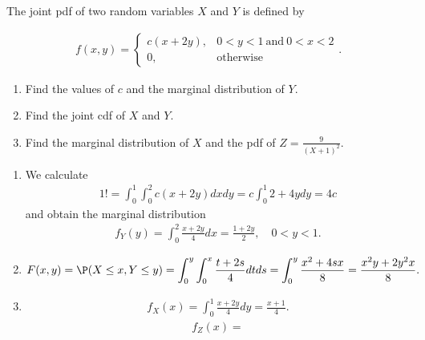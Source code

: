 
\begin{exercise}

The joint pdf of two random variables $X$ and $Y$ is defined by

\begin{align*}
    f(x, y)
    =
    \begin{cases}
        c (x + 2 y), & 0 < y < 1 ~\text{and}~ 0 < x < 2 \\
        0,           & \text{otherwise}
    \end{cases}.
\end{align*}

\begin{enumerate}[label = (\alph*)]
    \item Find the values of $c$ and the marginal distribution of $Y$.
    \item Find the joint cdf of $X$ and $Y$.
    \item Find the marginal distribution of $X$ and the pdf of $Z = \frac{9}{(X + 1)^2}$.
\end{enumerate}

\end{exercise}


\begin{solution}

\phantom{}

\begin{enumerate}[label = (\alph*)]
  \item We calculate
  \begin{align*}
    1 != \int_0^1\int_0^2 c(x + 2y) dx dy = c\int_0^1 2 + 4y dy = 4c
  \end{align*}
  and obtain the marginal distribution
  \begin{align*}
    f_Y(y) = \int_0^2 \frac{x + 2y}{4} dx = \frac{1 + 2y}{2}, \quad 0 < y < 1.
  \end{align*}
  \item
  \begin{align*}
    F(x,y) = \P(X \leq x, Y \leq y) = \int_0^y\int_0^x \frac{t+2s}{4} dt ds
    = \int_0^y \frac{x^2 + 4sx}{8} = \frac{x^2y + 2y^2x}{8}.
  \end{align*}
  \item
  \begin{align*}
    f_X(x) = \int_0^1 \frac{x + 2y}{4} dy = \frac{x + 1}{4}.
  \end{align*}
  \begin{align*}
    f_Z(x) =
  \end{align*}
\end{enumerate}

\end{solution}

